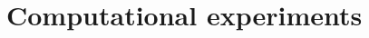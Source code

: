 \documentclass[mathserif,aspectratio=149]{beamer}
\begin{document}


%
%
%
%



\section{Computational experiments}
\end{document}
